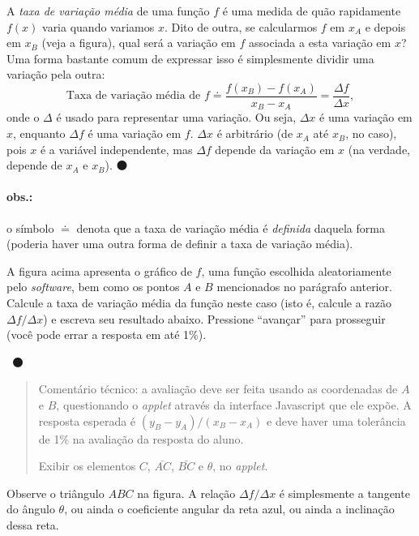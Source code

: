 \documentclass[fleqn,12pt]{scrartcl}
\newenvironment{ct}{\begin{quotation}\color{red!30!black}\sffamily\small Comentário técnico:}{\end{quotation}} %
\newcommand\foreign[1]{\textsl{#1}}
\newcommand\proceed{\textcolor{green!50!black}{$\medbullet$}\xspace}
\newcommand\answerfield{\framebox[3cm]{\phantom{A}}~\proceed}
\begin{document}
    A \emph{taxa de variação média} de uma função $f$ é uma medida de quão rapidamente $f(x)$ varia quando variamos $x$. Dito de outra, se calcularmos $f$ em $x_A$ e depois em $x_B$ (veja a figura), qual será a variação em $f$ associada a esta variação em $x$? Uma forma bastante comum de expressar isso é simplesmente dividir uma variação pela outra:
    \begin{equation*}
	\text{Taxa de variação média de $f$} \doteq \frac{f(x_B) - f(x_A)}{x_B - x_A} = \frac{\Delta f}{\Delta x},
    \end{equation*}
    onde o $\Delta$ é usado para representar uma variação. Ou seja, $\Delta x$ é uma variação em $x$, enquanto $\Delta f$ é uma variação em $f$. $\Delta x$ é arbitrário (de $x_A$ até $x_B$, no caso), pois $x$ é a variável independente, mas $\Delta f$ depende da variação em $x$ (na verdade, depende de $x_A$ e $x_B$). \proceed

    \paragraph{obs.:} o símbolo $\doteq$ denota que a taxa de variação média é \emph{definida} daquela forma (poderia haver uma outra forma de definir a taxa de variação média).

    A figura acima apresenta o gráfico de $f$, uma função escolhida aleatoriamente pelo \foreign{software}, bem como os pontos $A$ e $B$ mencionados no parágrafo anterior. Calcule a taxa de variação média da função neste caso (isto é, calcule a razão $\Delta f/\Delta x$) e escreva seu resultado abaixo. Pressione ``avançar'' para prosseguir (você pode errar a resposta em até 1\%).

    \answerfield

    \begin{ct}
	a avaliação deve ser feita usando as coordenadas de $A$ e $B$, questionando o \foreign{applet} através da interface Javascript que ele expõe. A resposta esperada é $(y_B - y_A)/(x_B - x_A)$ e deve haver uma tolerância de 1\% na avaliação da resposta do aluno.

	Exibir os elementos $C$, $\bar{AC}$, $\bar{BC}$ e $\theta$, no \foreign{applet}.
    \end{ct}

    Observe o triângulo $ABC$ na figura. A relação $\Delta f/\Delta x$ é simplesmente a tangente do ângulo $\theta$, ou ainda o coeficiente angular da reta azul, ou ainda a inclinação dessa reta.

\end{document}
